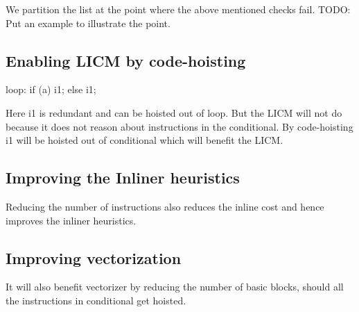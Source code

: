 \begin{section}
We partition the list at the point where the above mentioned checks fail.
TODO: Put an example to illustrate the point.

\section{Enabling LICM by code-hoisting}
loop:
if (a)
  i1;
else
  i1;

Here i1 is redundant and can be hoisted out of loop. But the LICM will not do because it does not reason about instructions in the conditional.
By code-hoisting i1 will be hoisted out of conditional which will benefit the LICM.

\section{Improving the Inliner heuristics}
Reducing the number of instructions also reduces the inline cost and hence improves the inliner heuristics.

\section{Improving vectorization}
It will also benefit vectorizer by reducing the number
of basic blocks, should all the instructions in conditional get hoisted.

\end{section}


